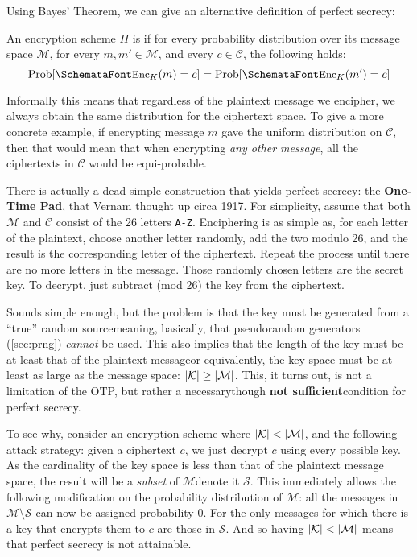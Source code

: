   Using Bayes' Theorem, we can give an alternative definition of perfect secrecy:
  \begin{theorem}
    \label{thm:perf_sec}
    An encryption scheme $\Pi$ is  if for every probability distribution over its message space $\mathcal{M}$, for every $m, m'\in \mathcal{M}$, and every $c\in \mathcal{C}$, the following holds:
    \begin{equation}
      \textup{Prob}[\sgg{Enc}_K(m) = c] = \textup{Prob}[\sgg{Enc}_K(m') = c]
    \end{equation}
  \end{theorem}
  \noindent Informally this means that regardless of the plaintext message we encipher, we always obtain the same distribution for the ciphertext space. To give a more concrete example, if encrypting message $m$ gave the uniform distribution on $\mathcal{C}$, then that would mean that when encrypting \emph{any other message}, all the ciphertexts in $\mathcal{C}$ would be equi-probable.
  
  \bigskip

   There is actually a dead simple construction that yields perfect secrecy: the \textbf{One-Time Pad}, that Vernam thought up circa 1917. For simplicity, assume that both $\mathcal{M}$ and $\mathcal{C}$ consist of the 26 letters \texttt{A-Z}. Enciphering is as simple as, for each letter of the plaintext, choose another letter randomly, add the two modulo 26, and the result is the corresponding letter of the ciphertext. Repeat the process until there are no more letters in the message. Those randomly chosen letters are the secret key. To decrypt, just subtract (mod 26) the key from the ciphertext.

  Sounds simple enough, but the problem is that the key must be generated from a ``true'' random source\emd meaning, basically, that pseudorandom generators (\ts\ref{sec:prng}) \emph{cannot} be used. This also implies that the length of the key must be at least that of the plaintext message\emd or equivalently, the key space must be at least as large as the message space: $\lvert\mathcal{K}\rvert \ge \lvert\mathcal{M}\rvert$. This, it turns out, is not a limitation of the OTP, but rather a necessary\emd though \textbf{not sufficient}\emd condition for perfect secrecy.

  To see why, consider an encryption scheme where $\lvert\mathcal{K}\rvert < \lvert\mathcal{M}\rvert$, and the following attack strategy: given a ciphertext $c$, we just decrypt $c$ using every possible key. As the cardinality of the key space is less than that of the plaintext message space, the result will be a \emph{subset} of $\mathcal{M}$\emd denote it $\mathcal{S}$. This immediately allows the following modification on the probability distribution of $\mathcal{M}$: all the messages in $\mathcal{M}\setminus \mathcal{S}$ can now be assigned probability $0$. For the only messages for which there is a key that encrypts them to $c$ are those in $\mathcal{S}$. And so having $\lvert\mathcal{K}\rvert < \lvert\mathcal{M}\rvert$ means that perfect secrecy is not attainable.

